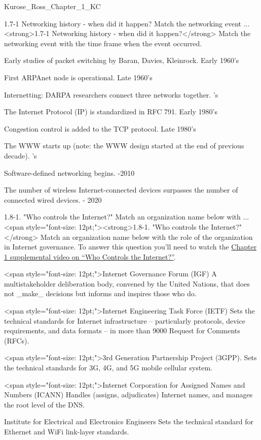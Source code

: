 \documentclass[a4paper]{article}
\begin{document}
\begin{quiz}{Kurose_Ross_Chapter_1_KC}
\begin{matching}[
	points=1,
	penalty=0.33333,
]{1.7-1 Networking history - when did it happen? Match the networking event ...}
<strong>1.7-1 Networking history - when did it happen?</strong> Match the networking event with the time frame when the event occurred.
\item Early studies of packet switching by Baran, Davies, Kleinrock. \answer Early 1960's
\item First ARPAnet node is operational. \answer Late 1960's
\item Internetting: DARPA researchers connect three networks together. 's
\item The Internet Protocol (IP) is standardized in RFC 791. \answer Early 1980's
\item Congestion control is added to the TCP protocol. \answer Late 1980's
\item The WWW starts up (note: the WWW design started at the end of previous decade). 's
\item Software-defined networking begins. -2010
\item The number of wireless Internet-connected devices surpasses the number of connected wired devices.  - 2020
\end{matching}

\begin{matching}[
	points=1,
	penalty=0.33333,
]{1.8-1.  "Who controls the Internet?"  Match an organization name below with ...}
<span style="font-size: 12pt;"><strong>1.8-1.  "Who controls the Internet?"</strong>  Match an organization name below with the role of the organization in Internet governance. To answer this question you’ll need to watch the \href{https://www.youtube.com/watch?v=xrd4hD_9fS8}{Chapter 1 supplemental video on “Who Controls the Internet?”}.
\item <span style="font-size: 12pt;">Internet Governance Forum (IGF)  \answer A multistakeholder deliberation body, convened by the United Nations, that does not _make_ decisions but informs and inspires those who do.
\item <span style="font-size: 12pt;">Internet Engineering Task Force (IETF) \answer Sets the technical standards for Internet infrastructure -- particularly protocols, device requirements, and data formats -- in more than 9000 Request for Comments (RFCs).
\item <span style="font-size: 12pt;">3rd Generation Partnership Project (3GPP). \answer Sets the technical standards for 3G, 4G, and 5G mobile cellular system.
\item <span style="font-size: 12pt;">Internet Corporation for Assigned Names and Numbers (ICANN) \answer Handles (assigns, adjudicates) Internet names, and manages the root level of the DNS.
\item Institute for Electrical and Electronics Engineers \answer Sets the technical standard for Ethernet and WiFi link-layer standards.
\end{matching}


\end{quiz}
\end{document}
